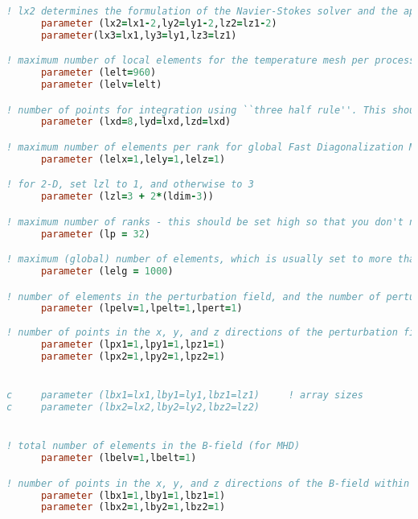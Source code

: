 \documentclass[10pt]{article}
\numberwithin{equation}{section} %
\begin{document}
\begin{itemize}
\begin{lstlisting}[language=Fortran]
! lx2 determines the formulation of the Navier-Stokes solver and the approximation order for the pressure? (i.e. the choice between Pn-Pn or Pn-Pn-2)
      parameter (lx2=lx1-2,ly2=ly1-2,lz2=lz1-2)
      parameter(lx3=lx1,ly3=ly1,lz3=lz1)

! maximum number of local elements for the temperature mesh per process. This must be at least as large as the maximum number of elements divided amongst the number of processes (plus one to catch non-even division of elements amongst processes). Likewise, lelv sets the maximum number of local elements for the velocity mesh per process. nelt and nelv are the actual number of temperature and velocity elements, respectively, for _each_ process.
      parameter (lelt=960)
      parameter (lelv=lelt)

! number of points for integration using ``three half rule''. This should typically be set to lxd=1.5*lx1. On some platforms, however, you should set lxd to an even number. You should try to minimize this polynomial order used for the fine grid.
      parameter (lxd=8,lyd=lxd,lzd=lxd)

! maximum number of elements per rank for global Fast Diagonalization Method solver
      parameter (lelx=1,lely=1,lelz=1)

! for 2-D, set lzl to 1, and otherwise to 3
      parameter (lzl=3 + 2*(ldim-3))

! maximum number of ranks - this should be set high so that you don't need to recompile to run on larger numbers of processes
      parameter (lp = 32)

! maximum (global) number of elements, which is usually set to more than the number of elements in the mesh. This can be set to the exact number of elements for best memory usage. 
      parameter (lelg = 1000)

! number of elements in the perturbation field, and the number of perturbation fields
      parameter (lpelv=1,lpelt=1,lpert=1)
   
! number of points in the x, y, and z directions of the perturbation field within each element of mesh 1 and mesh 2   
      parameter (lpx1=1,lpy1=1,lpz1=1)
      parameter (lpx2=1,lpy2=1,lpz2=1)


c     parameter (lbx1=lx1,lby1=ly1,lbz1=lz1)     ! array sizes
c     parameter (lbx2=lx2,lby2=ly2,lbz2=lz2)


! total number of elements in the B-field (for MHD)
      parameter (lbelv=1,lbelt=1)

! number of points in the x, y, and z directions of the B-field within each element of mesh 1 and mesh 2
      parameter (lbx1=1,lby1=1,lbz1=1)
      parameter (lbx2=1,lby2=1,lbz2=1)


\end{lstlisting}
\end{itemize}
\end{document}
